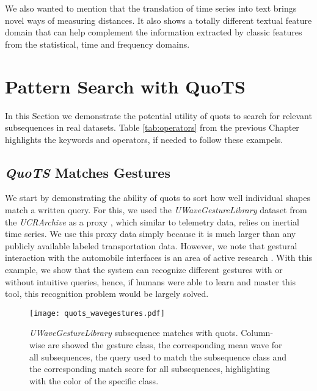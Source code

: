 \par
We also wanted to mention that the translation of time series into text brings novel ways of measuring distances. It also shows a totally different textual feature domain that can help complement the information extracted by classic features from the statistical, time and frequency domains.

\section{Pattern Search with QuoTS}

In this Section we demonstrate the potential utility of \gls{quots} to search for relevant subsequences in real datasets. Table \ref{tab:operators} from the previous Chapter highlights the keywords and operators, if needed to follow these exampels.

\subsection{\textit{QuoTS} Matches Gestures}

We start by demonstrating the ability of \gls{quots} to sort how well individual shapes match a written query. For this, we used the \textit{UWaveGestureLibrary} dataset from the \textit{UCRArchive} as a proxy \cite{uWave}, which similar to telemetry data, relies on inertial time series. We use this proxy data simply because it is much larger than any publicly available labeled transportation data. However, we note that gestural interaction with the automobile interfaces is an area of active research \cite{autoui1, autoui2}. With this example, we show that the system can recognize different gestures with or without intuitive queries, hence, if humans were able to learn and master this tool, this recognition problem would be largely solved.

\begin{figure}
\centering
\texttt{[image: quots\_wavegestures.pdf]}
\caption{\textit{UWaveGestureLibrary} subsequence matches with \gls{quots}. Column-wise are showed the gesture class, the corresponding mean wave for all subsequences, the query used to match the subsequence class and the corresponding match score for all subsequences, highlighting with the color of the specific class.}
\label{fig:quots_uwave}
\end{figure}

